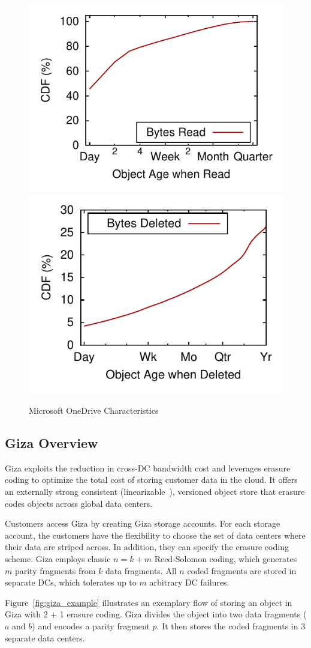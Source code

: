 \begin{figure}[htp]
\begin{minipage}{0.7\textwidth}
		\hspace{-1em}
    \subcaptionbox{\label{fig:write_read_gap-bytes_read}}
      {\includegraphics[height=0.275\textwidth]{data/write_read_gap-bytes_read}}%
		\hspace{-1.5em}
    \subcaptionbox{\label{fig:deletion}}
      {\includegraphics[height=0.275\textwidth]{data/age-bytes}}%
\caption{Microsoft OneDrive Characteristics}
\label{fig:case_for_giza}
\end{minipage}%

\end{figure}

\subsection{Giza Overview}

Giza exploits the reduction in cross-DC bandwidth cost and leverages erasure
coding to optimize the total cost of storing customer data in the cloud. It
offers an externally strong consistent
(linearizable~\cite{herlihy90linearizability}), versioned object store that
erasure codes objects across global data centers.

Customers access Giza by creating Giza storage accounts. For each storage
account, the customers have the flexibility to choose the set of data centers
where their data are striped across. In addition, they can specify the erasure
coding scheme. Giza employs classic $n = k + m$ Reed-Solomon coding, which
generates $m$ parity fragments from $k$ data fragments. All $n$ coded fragments
are stored in separate DCs, which tolerates up to $m$ arbitrary DC failures.

Figure~\ref{fig:giza_example} illustrates an exemplary flow of storing an object
in Giza with 2 + 1 erasure coding. Giza divides the object into two data
fragments ($a$ and $b$) and encodes a parity fragment $p$. It then stores the
coded fragments in $3$ separate data centers.


